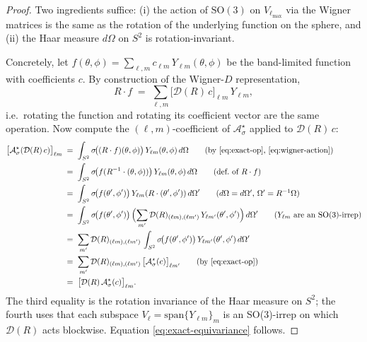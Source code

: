 \documentclass{article}
\begin{document}
\begin{proof}
Two ingredients suffice: (i) the action of $\mathrm{SO}(3)$ on
$V_{\ell_{\max}}$ via the Wigner matrices is the same as the rotation
of the underlying function on the sphere, and (ii) the Haar measure
$d\Omega$ on $S^2$ is rotation-invariant.

Concretely, let $f(\theta, \phi) = \sum_{\ell, m} c_{\ell m}\,Y_{\ell
m}(\theta, \phi)$ be the band-limited function with coefficients $c$.
By construction of the Wigner-$D$ representation,
\begin{equation}
  R \cdot f
  \;=\;
  \sum_{\ell, m} \bigl[\mathcal{D}(R)\,c\bigr]_{\ell m}\,
  Y_{\ell m},
  \label{eq:wigner-action}
\end{equation}
i.e.\ rotating the function and rotating its coefficient vector are
the same operation. Now compute the $(\ell, m)$-coefficient of
$\mathcal{A}^{\star}_\sigma$ applied to $\mathcal{D}(R)\,c$:
\begin{align}
  \bigl[\mathcal{A}^{\star}_\sigma(\mathcal{D}(R)\,c)\bigr]_{\ell m}
  &\;=\; \int_{S^2} \sigma\!\bigl((R \cdot f)(\theta, \phi)\bigr)\,
         Y_{\ell m}(\theta, \phi)\,d\Omega
   \tag{by \eqref{eq:exact-op}, \eqref{eq:wigner-action}} \\
  &\;=\; \int_{S^2} \sigma\!\bigl(f(R^{-1} \cdot (\theta, \phi))\bigr)\,
         Y_{\ell m}(\theta, \phi)\,d\Omega
   \tag{def.\ of $R \cdot f$} \\
  &\;=\; \int_{S^2} \sigma\!\bigl(f(\theta', \phi')\bigr)\,
         Y_{\ell m}(R \cdot (\theta', \phi'))\,d\Omega'
   \tag{$d\Omega = d\Omega'$, $\Omega' = R^{-1}\Omega$} \\
  &\;=\; \int_{S^2} \sigma\!\bigl(f(\theta', \phi')\bigr)\,
         \Bigl(\sum_{m'} \mathcal{D}(R)_{(\ell m), (\ell m')}\,
                          Y_{\ell m'}(\theta', \phi')\Bigr)\,d\Omega'
   \tag{$Y_{\ell m}$ are an SO(3)-irrep} \\
  &\;=\; \sum_{m'} \mathcal{D}(R)_{(\ell m), (\ell m')}\,
         \int_{S^2} \sigma\!\bigl(f(\theta', \phi')\bigr)\,
                      Y_{\ell m'}(\theta', \phi')\,d\Omega' \\
  &\;=\; \sum_{m'} \mathcal{D}(R)_{(\ell m), (\ell m')}\,
         \bigl[\mathcal{A}^{\star}_\sigma(c)\bigr]_{\ell m'}
   \tag{by \eqref{eq:exact-op}} \\
  &\;=\; \bigl[\mathcal{D}(R)\,
         \mathcal{A}^{\star}_\sigma(c)\bigr]_{\ell m}.
\end{align}
The third equality is the rotation invariance of the Haar measure on
$S^2$; the fourth uses that each subspace
$V_\ell = \mathrm{span}\{Y_{\ell m}\}_m$ is an SO(3)-irrep on which
$\mathcal{D}(R)$ acts blockwise. Equation \eqref{eq:exact-equivariance}
follows.
\end{proof}
\end{document}
